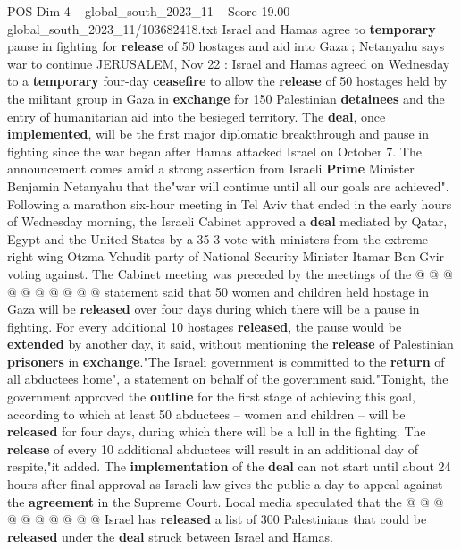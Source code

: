 \begin{textsample}{POS Dim 4 – global\_south\_2023\_11 – Score 19.00 – global\_south\_2023\_11/103682418.txt}  \label{ex:f4_pos_169}
Israel and Hamas agree to \textbf{temporary} pause in fighting for \textbf{release} of 50 hostages and aid into Gaza ; Netanyahu says war to continue JERUSALEM, Nov 22 : Israel and Hamas agreed on Wednesday to a \textbf{temporary} four-day \textbf{ceasefire} to allow the \textbf{release} of 50 hostages held by the militant group in Gaza in \textbf{exchange} for 150 Palestinian \textbf{detainees} and the entry of humanitarian aid into the besieged territory.
The \textbf{deal}, once \textbf{implemented}, will be the first major diplomatic breakthrough and pause in fighting since the war began after Hamas attacked Israel on October 7.
The announcement comes amid a strong assertion from Israeli \textbf{Prime} Minister Benjamin Netanyahu that the"war will continue until all our goals are achieved".
Following a marathon six-hour meeting in Tel Aviv that ended in the early hours of Wednesday morning, the Israeli Cabinet approved a \textbf{deal} mediated by Qatar, Egypt and the United States by a 35-3 vote with ministers from the extreme right-wing Otzma Yehudit party of National Security Minister Itamar Ben Gvir voting against.
The Cabinet meeting was preceded by the meetings of the @ @ @ @ @ @ @ @ @ @ statement said that 50 women and children held hostage in Gaza will be \textbf{released} over four days during which there will be a pause in fighting.
For every additional 10 hostages \textbf{released}, the pause would be \textbf{extended} by another day, it said, without mentioning the \textbf{release} of Palestinian \textbf{prisoners} in \textbf{exchange}."The Israeli government is committed to the \textbf{return} of all abductees home", a statement on behalf of the government said."Tonight, the government approved the \textbf{outline} for the first stage of achieving this goal, according to which at least 50 abductees -- women and children -- will be \textbf{released} for four days, during which there will be a lull in the fighting.
The \textbf{release} of every 10 additional abductees will result in an additional day of respite,"it added.
The \textbf{implementation} of the \textbf{deal} can not start until about 24 hours after final approval as Israeli law gives the public a day to appeal against the \textbf{agreement} in the Supreme Court.
Local media speculated that the @ @ @ @ @ @ @ @ @ @ Israel has \textbf{released} a list of 300 Palestinians that could be \textbf{released} under the \textbf{deal} struck between Israel and Hamas.

\end{textsample}
